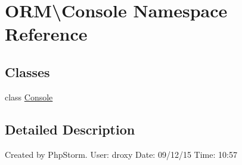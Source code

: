 \hypertarget{namespaceORM_1_1Console}{}\section{O\+RM\textbackslash{}Console Namespace Reference}
\label{namespaceORM_1_1Console}
\subsection*{Classes}
\begin{DoxyCompactItemize}
\item 
class \hyperlink{classORM_1_1Console_1_1Console}{Console}
\end{DoxyCompactItemize}


\subsection{Detailed Description}
Created by Php\+Storm. User\+: droxy Date\+: 09/12/15 Time\+: 10\+:57 